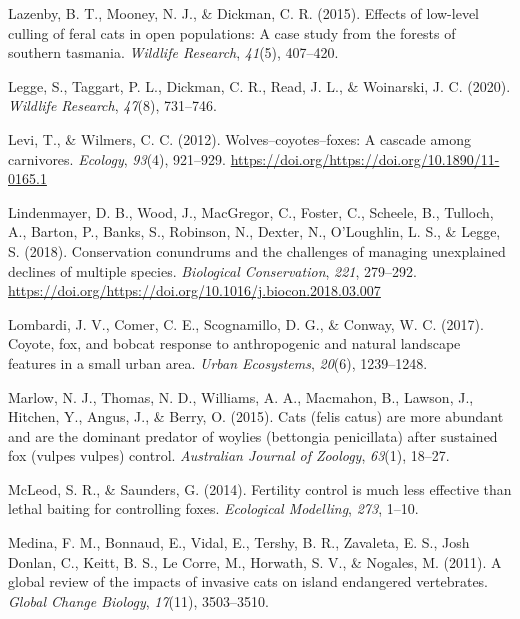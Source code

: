 \documentclass[]{elsarticle} %
\begin{document}
\leavevmode\hypertarget{ref-lazenby2015}{}%
Lazenby, B. T., Mooney, N. J., \& Dickman, C. R. (2015). Effects of low-level culling of feral cats in open populations: A case study from the forests of southern tasmania. \emph{Wildlife Research}, \emph{41}(5), 407--420.

\leavevmode\hypertarget{ref-legge2020}{}%
Legge, S., Taggart, P. L., Dickman, C. R., Read, J. L., \& Woinarski, J. C. (2020). \emph{Wildlife Research}, \emph{47}(8), 731--746.

\leavevmode\hypertarget{ref-https:ux2fux2fdoi.orgux2f10.1890ux2f11-0165.1}{}%
Levi, T., \& Wilmers, C. C. (2012). Wolves--coyotes--foxes: A cascade among carnivores. \emph{Ecology}, \emph{93}(4), 921--929. \url{https://doi.org/https://doi.org/10.1890/11-0165.1}

\leavevmode\hypertarget{ref-LINDENMAYER2018279}{}%
Lindenmayer, D. B., Wood, J., MacGregor, C., Foster, C., Scheele, B., Tulloch, A., Barton, P., Banks, S., Robinson, N., Dexter, N., O'Loughlin, L. S., \& Legge, S. (2018). Conservation conundrums and the challenges of managing unexplained declines of multiple species. \emph{Biological Conservation}, \emph{221}, 279--292. \url{https://doi.org/https://doi.org/10.1016/j.biocon.2018.03.007}

\leavevmode\hypertarget{ref-lombardi2017coyote}{}%
Lombardi, J. V., Comer, C. E., Scognamillo, D. G., \& Conway, W. C. (2017). Coyote, fox, and bobcat response to anthropogenic and natural landscape features in a small urban area. \emph{Urban Ecosystems}, \emph{20}(6), 1239--1248.

\leavevmode\hypertarget{ref-marlow2015}{}%
Marlow, N. J., Thomas, N. D., Williams, A. A., Macmahon, B., Lawson, J., Hitchen, Y., Angus, J., \& Berry, O. (2015). Cats (felis catus) are more abundant and are the dominant predator of woylies (bettongia penicillata) after sustained fox (vulpes vulpes) control. \emph{Australian Journal of Zoology}, \emph{63}(1), 18--27.

\leavevmode\hypertarget{ref-mcleod2014}{}%
McLeod, S. R., \& Saunders, G. (2014). Fertility control is much less effective than lethal baiting for controlling foxes. \emph{Ecological Modelling}, \emph{273}, 1--10.

\leavevmode\hypertarget{ref-medina2011}{}%
Medina, F. M., Bonnaud, E., Vidal, E., Tershy, B. R., Zavaleta, E. S., Josh Donlan, C., Keitt, B. S., Le Corre, M., Horwath, S. V., \& Nogales, M. (2011). A global review of the impacts of invasive cats on island endangered vertebrates. \emph{Global Change Biology}, \emph{17}(11), 3503--3510.
\end{document}
